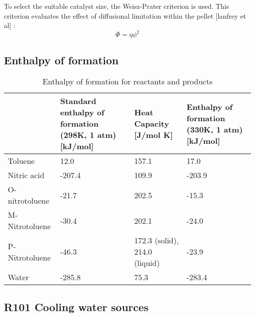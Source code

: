 To select the suitable catalyst size, the Weisz-Prater criterion is used. This criterion evaluates the effect of diffusional limitation within the pellet [lanfrey et al] :
\begin{equation}
    \Phi = \eta \phi^2
\end{equation}
\subsection{Enthalpy of formation}
\begin{table}[H]
\centering
\caption{Enthalpy of formation for reactants and products}
\label{tab:Heat enthalpy table}
\begin{tabularx}{\linewidth}{l|XXX}
\toprule
                                                                & Standard enthalpy of formation (298K, 1 atm) [kJ/mol] & Heat Capacity [J/mol K] & Enthalpy of formation (330K, 1 atm) [kJ/mol] \\ \midrule
Toluene                        & 12.0              & 157.1              & 17.0                     \\
Nitric acid                      & -207.4              & 109.9              & -203.9                       \\
O-nitrotoluene & -21.7             & 202.5              & -15.3              \\ 
M-Nitrotoluene                      & -30.4              & 202.1             & -24.0                       \\
P-Nitrotoluene                      & -46.3              & 172.3 (solid), 214.0 (liquid)             & -23.9                        \\
Water                     & -285.8              & 75.3              & -283.4                        \\
\bottomrule
\end{tabularx}
\end{table}

\subsection{R101 Cooling water sources}
\label{sec:R101-CW}

\begin{table}[h]
\centering
\caption{Cooling water sources for R101}
\label{tab:cwtable}
\end{table}

